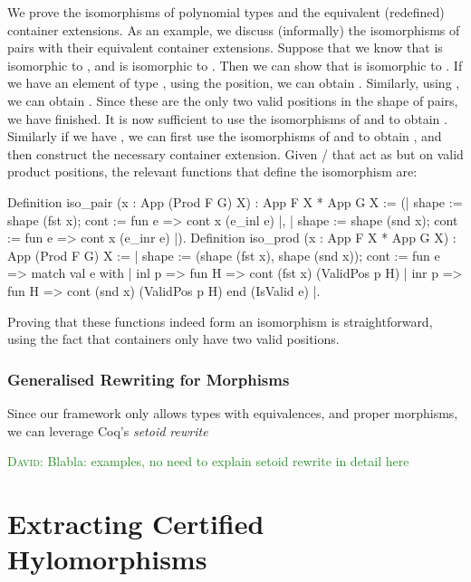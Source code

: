 \documentclass[anonymous, a4paper, UKenglish, cleveref, autoref, thm-restate]{lipics-v2021}
\newcommand{\dcas}[1]{\textcolor{ForestGreen}{\textsc{David}: #1}}
\begin{document}
We prove the isomorphisms of polynomial types and the equivalent (redefined)
container extensions. As an example, we discuss (informally) the isomorphisms
of pairs with their equivalent container extensions. Suppose that we
know that  is isomorphic to , and
 is isomorphic to . Then we can
show that  is isomorphic to
.  If we have an element of type 
,
using the  position, we can obtain
.  Similarly, using , we can
obtain . Since these are the only two valid positions
in the shape of pairs, we have finished. It is now sufficient to use the
isomorphisms of  and  to
obtain . Similarly if we have ,
we can first use the isomorphisms of 
 and
 to obtain
, and then construct the necessary container
extension. Given / that act as
 but on valid product positions, the relevant
functions that define the isomorphism are:
\begin{coqcode}
Definition iso_pair (x : App (Prod F G) X) : App F X * App G X :=
  ({| shape := shape (fst x); cont := fun e => cont x (e_inl e) |}, 
   {| shape := shape (snd x); cont := fun e => cont x (e_inr e) |}).
Definition iso_prod (x : App F X * App G X) : App (Prod F G) X :=
{| shape := (shape (fst x), shape (snd x));
   cont := fun e => match val e with 
                    | inl p => fun H => cont (fst x) (ValidPos p H)
                    | inr p => fun H => cont (snd x) (ValidPos p H)
                    end (IsValid e)
|}.
\end{coqcode}
Proving that these functions indeed form an isomorphism is straightforward,
using the fact that  containers only have two valid positions.

\subsubsection{Generalised Rewriting for Morphisms}

Since our framework only allows types with equivalences, and proper morphisms,
we can leverage Coq's \emph{setoid rewrite}

\dcas{Blabla: examples, no need to explain setoid rewrite in detail here}

\section{Extracting Certified Hylomorphisms}
\end{document}
